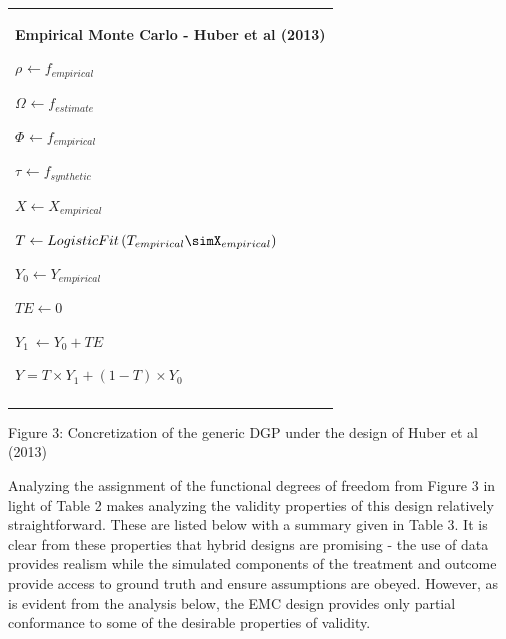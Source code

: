 \documentclass[../main.tex]{subfiles}
\begin{document}
\begin{table}[H]
 			\centering
\begin{tabular}{p{3.14in}}
\hline
\multicolumn{1}{|p{3.14in}|}{\textbf{Empirical Monte Carlo - Huber et al (2013)} \par  \(  \rho _{} \leftarrow f_{empirical}~ \)  \par  \(  \Omega _{} \leftarrow f_{estimate} \)  \par  \(  \Phi _{} \leftarrow f_{empirical} \)  \par  \(  \tau_{} \leftarrow f_{synthetic}~ \)  \par  \( X \leftarrow X_{empirical} \)  \par  \( T \leftarrow LogisticFit \left(  T_{empirical}\simX_{empirical} \right)  \)  \par  \( Y_{0} \leftarrow Y_{empirical} \)  \par  \( TE \leftarrow 0 \)  \par  \( Y_{1}~ \leftarrow Y_{0}+ TE \)  \par  \( Y = T \times Y_{1}+  \left( 1-T \right)  \times Y_{0} \)  \par } \\
\hhline{-}

\end{tabular}
 \end{table}




\vspace{\baselineskip}
Figure 3: Concretization of the generic DGP under the design of Huber et al (2013)\par


\vspace{\baselineskip}
Analyzing the assignment of the functional degrees of freedom from Figure 3 in light of Table 2 makes analyzing the validity properties of this design relatively straightforward. These are listed below with a summary given in Table 3. It is clear from these properties that hybrid designs are promising - the use of data provides realism while the simulated components of the treatment and outcome provide access to ground truth and ensure assumptions are obeyed. However, as is evident from the analysis below, the EMC design provides only partial conformance to some of the desirable properties of validity.\par
\end{document}
